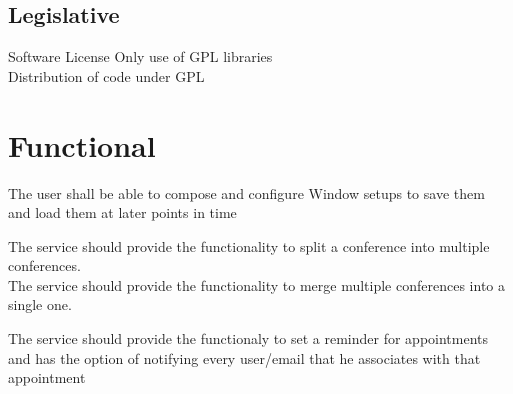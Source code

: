 \documentclass[8pt]{beamer}
\begin{document}
\subsection{Legislative}

\begin{frame}{Software License}
Only use of GPL libraries \\\pause
Distribution of code under GPL
\end{frame}
\section{Functional}
\begin{frame}

The user shall be able to compose and configure Window setups to
save them and load them at later points in time
\end{frame}
\begin{frame}
 
The service should provide the functionality to split a conference
into multiple conferences. \\\pause The service should provide the functionality to
merge multiple conferences into a single one.
\end{frame}

\begin{frame}
The service should provide the functionaly to set a reminder for
appointments and has the option of notifying every user/email that he
associates with that appointment
\end{frame}
\end{document}
